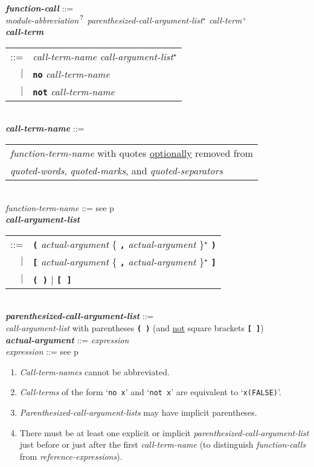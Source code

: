 \documentclass[12pt]{article}
\newcommand{\TT}[1]{{\tt \bfseries #1}}
\newcommand{\STAR}{{\Large $^\star$}}
\newcommand{\PLUS}[1][]{{$^{+#1}$}}
\newcommand{\QMARK}{{$^{\,\mbox{\footnotesize ?}}$}}
\newcommand{\ttkey}[1]{{\tt \bfseries #1}}
\newcommand{\emkey}[1]{{\em \bfseries #1}}
\newcommand{\pagref}[1]{p\pageref{#1}}
\newenvironment{indpar}[1][0.3in]%
	{\begin{list}{}%
		     {\setlength{\itemsep}{0in}%
		      \setlength{\topsep}{0in}%
		      \setlength{\parsep}{1ex}%
		      \setlength{\labelwidth}{#1}%
		      \setlength{\leftmargin}{#1}%
		      \addtolength{\leftmargin}{\labelsep}}%
	 \item}%
	{\end{list}}
\begin{document}
\begin{indpar}
\emkey{function-call}\label{FUNCTION-CALL} ::= \\
\hspace*{0.5in}
        {\em module-abbreviation}\QMARK{}
        {\em parenthesized-call-argument-list}\STAR{}
        {\em call-term}\PLUS{}
\\[0.5ex]
\emkey{call-term}\label{CALL-TERM}
    \begin{tabular}[t]{rl}
    ::= & {\em call-term-name} {\em call-argument-list}\STAR{} \\
    $|$ & \ttkey{no} {\em call-term-name} \\
    $|$ & \ttkey{not} {\em call-term-name} \\
    \end{tabular}
\\[0.5ex]
\emkey{call-term-name}\label{CALL-TERM-NAME} ::=
    \begin{tabular}[t]{@{}l}
    {\em function-term-name} with quotes \underline{optionally} removed from \\
    {\em quoted-words}, {\em quoted-marks}, and {\em quoted-separators}
    \end{tabular}
\\[0.5ex]
{\em function-term-name} ::= see \pagref{FUNCTION-TERM-NAME}
\\[0.5ex]
\emkey{call-argument-list}\label{CALL-ARGUMENT-LIST}
    \begin{tabular}[t]{rl}
    ::= & \TT{(} {\em actual-argument}
          \{ \TT{,} {\em actual-argument} \}\STAR{} \TT{)} \\
    $|$ & \TT{[} {\em actual-argument}
          \{ \TT{,} {\em actual-argument} \}\STAR{} \TT{]} \\
    $|$ & \TT{(~)} $|$ \TT{[~]} \\
    \end{tabular}
\\[0.5ex]
\emkey{parenthesized-call-argument-list}%
    \label{PARENTHESIZED-CALL-ARGUMENT-LIST} ::= \\
\hspace*{0.5in}
    {\em call-argument-list} with parentheses \TT{(~)}
    (and \underline{not} square brackets \TT{[~]})
\\[0.5ex]
\emkey{actual-argument} ::= {\em expression}
\\[0.5ex]
{\em expression} ::= see \pagref{EXPRESSION}
\begin{enumerate}
\item {\em Call-term-names} cannot be abbreviated.
\item {\em Call-terms} of the form `{\tt no x}' and `{\tt not x}' are
equivalent to `{\tt x(FALSE)}'.
\item {\em Parenthesized-call-argument-lists} may have implicit
parentheses.
\item\label{PARENTHESIZED-ARGUMENT-LIST-RULE}
There must be at least one explicit or implicit
{\em parenthesized-call-argument-list} just before or just
after the first {\em call-term-name} (to distinguish {\em function-calls}
from {\em reference-expressions}).
\end{enumerate}
\end{indpar}
\end{document}
